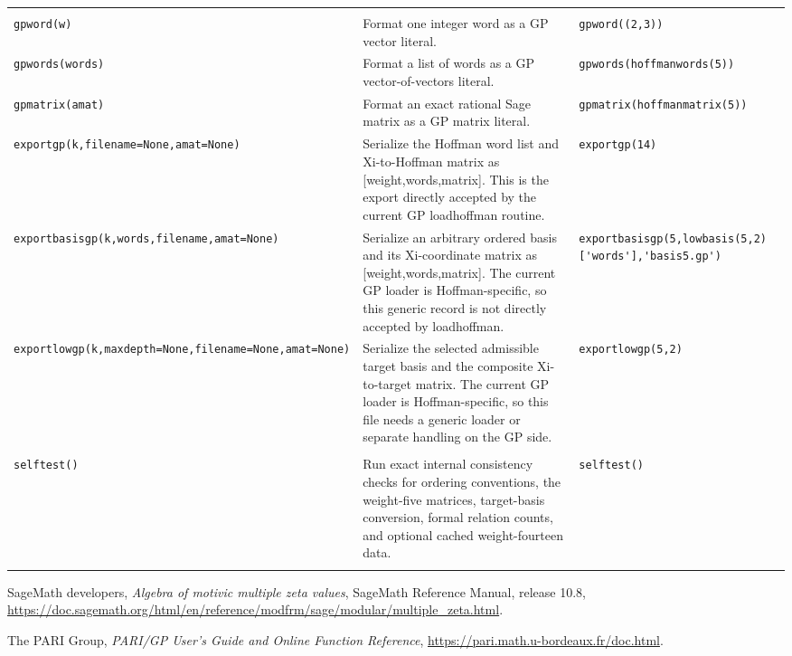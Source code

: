 \documentclass[12pt]{amsproc}
\newcommand{\code}[1]{\nolinkurl{#1}}
\begin{document}
\begin{longtable}{@{}L{0.245\textwidth}L{0.440\textwidth}L{0.245\textwidth}@{}}
\addlinespace[2pt]
\addlinespace[3pt]\\[2pt]
\code{gpword(w)} & Format one integer word as a GP vector literal. & \code{gpword((2,3))} \\
\addlinespace[2pt]
\code{gpwords(words)} & Format a list of words as a GP vector-of-vectors literal. & \code{gpwords(hoffmanwords(5))} \\
\addlinespace[2pt]
\code{gpmatrix(amat)} & Format an exact rational Sage matrix as a GP matrix literal. & \code{gpmatrix(hoffmanmatrix(5))} \\
\addlinespace[2pt]
\code{exportgp(k,filename=None,amat=None)} & Serialize the Hoffman word list and Xi-to-Hoffman matrix as [weight,words,matrix]. This is the export directly accepted by the current GP loadhoffman routine. & \code{exportgp(14)} \\
\addlinespace[2pt]
\code{exportbasisgp(k,words,filename,amat=None)} & Serialize an arbitrary ordered basis and its Xi-coordinate matrix as [weight,words,matrix]. The current GP loader is Hoffman-specific, so this generic record is not directly accepted by loadhoffman. & \code{exportbasisgp(5,lowbasis(5,2)['words'],'basis5.gp')} \\
\addlinespace[2pt]
\code{exportlowgp(k,maxdepth=None,filename=None,amat=None)} & Serialize the selected admissible target basis and the composite Xi-to-target matrix. The current GP loader is Hoffman-specific, so this file needs a generic loader or separate handling on the GP side. & \code{exportlowgp(5,2)} \\
\addlinespace[2pt]
\addlinespace[3pt]\\[2pt]
\code{selftest()} & Run exact internal consistency checks for ordering conventions, the weight-five matrices, target-basis conversion, formal relation counts, and optional cached weight-fourteen data. & \code{selftest()} \\
\addlinespace[2pt]
\bottomrule
\end{longtable}
\endgroup


\begin{thebibliography}{99}

SageMath developers,
\emph{Algebra of motivic multiple zeta values},
SageMath Reference Manual, release 10.8,
\url{https://doc.sagemath.org/html/en/reference/modfrm/sage/modular/multiple_zeta.html}.

The PARI Group,
\emph{PARI/GP User's Guide and Online Function Reference},
\url{https://pari.math.u-bordeaux.fr/doc.html}.
\end{thebibliography}
\end{document}
